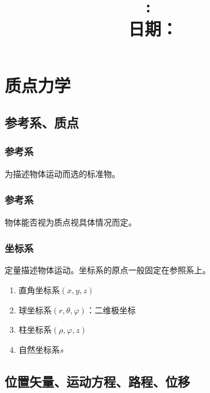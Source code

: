 \documentclass[12pt, a4paper]{article}
\title{
    \vspace{2in}
    \textmd{\textbf{\hmwkClass:\ \hmwkTitle}}\\
    \normalsize\vspace{0.1in}\small{日期： \hmwkDueDate}\\
    \vspace{0.1in}\large{\textit{\myUniversiy}}
    \vspace{3in}
}
\author{\hmwkAuthorName}
\date{}
\numberwithin{equation}{section}
\begin{document}
\maketitle

\pagebreak


\tableofcontents

\pagebreak


\pagebreak

\section{质点力学}

\subsection{参考系、质点}

\subsubsection*{参考系}

    为描述物体运动而选的标准物。

\subsubsection*{参考系}

    物体能否视为质点视具体情况而定。

\subsubsection*{坐标系}

    定量描述物体运动。坐标系的原点一般固定在参照系上。

    \begin{enumerate}
        \item 直角坐标系\(\left(x,y,z\right)\)
        \item 球坐标系\(\left(r,\theta,\varphi\right)\)：二维极坐标
        \item 柱坐标系\(\left(\rho,\varphi,z\right)\)
        \item 自然坐标系\(s\)
    \end{enumerate}

\subsection{位置矢量、运动方程、路程、位移}
\end{document}

